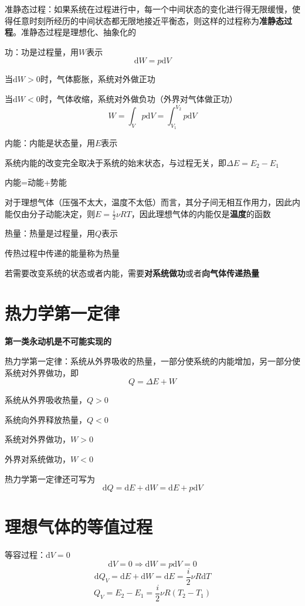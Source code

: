\documentclass[12pt, a4paper, twoside]{ctexbook}
\begin{document}
{\sonti 准静态过程}：如果系统在过程进行中，每一个中间状态的变化进行得无限缓慢，使得任意时刻所经历的中间状态都无限地接近平衡态，则这样的过程称为\textbf{准静态过程}。准静态过程是理想化、抽象化的

{\sonti 功}：功是过程量，用$W$表示
$$
\mathrm{d}W=p\mathrm{d}V
$$

当$\mathrm{d}W>0$时，气体膨胀，系统对外做正功

当$\mathrm{d}W<0$时，气体收缩，系统对外做负功（外界对气体做正功）
$$
W=\int_V p\mathrm{d}V=\int_{V_1}^{V_2} p\mathrm{d}V
$$

{\sonti 内能}：内能是状态量，用$E$表示

系统内能的改变完全取决于系统的始末状态，与过程无关，即$\Delta E=E_2-E_1$

内能=动能+势能

对于理想气体（压强不太大，温度不太低）而言，其分子间无相互作用力，因此内能仅由分子动能决定，则$E=\frac{i}{2}\nu RT$，因此理想气体的内能仅是\textbf{温度}的函数

{\sonti 热量}：热量是过程量，用$Q$表示

传热过程中传递的能量称为热量

若需要改变系统的状态或者内能，需要\textbf{对系统做功}或者\textbf{向气体传递热量}
\section{热力学第一定律}
\textbf{第一类永动机是不可能实现的}

{\sonti 热力学第一定律}：系统从外界吸收的热量，一部分使系统的内能增加，另一部分使系统对外界做功，即
$$
Q=\Delta E+W
$$

系统从外界吸收热量，$Q>0$

系统向外界释放热量，$Q<0$

系统对外界做功，$W>0$

外界对系统做功，$W<0$

热力学第一定律还可写为
$$
\mathrm{d}Q=\mathrm{d}E+\mathrm{d}W=\mathrm{d}E+p\mathrm{d}V
$$

\section{理想气体的等值过程}
{\sonti 等容过程}：$\mathrm{d}V=0$
$$
\mathrm{d}V=0 \Rightarrow \mathrm{d}W=p\mathrm{d}V=0
$$
$$
\mathrm{d}Q_V=\mathrm{d}E+\mathrm{d}W=\mathrm{d}E=\frac{i}{2}\nu R\mathrm{d}T
$$
$$
Q_V=E_2-E_1=\frac{i}{2}\nu R(T_2-T_1)
$$
\end{document}
